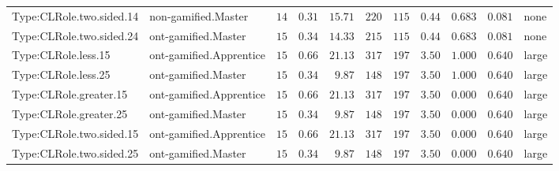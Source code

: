 \documentclass[6pt,a4paper]{article}
\begin{document}
{\begin{longtable}{llrrrrrrrrl}
Type:CLRole.two.sided.14&non-gamified.Master&$14$&$0.31$&$15.71$&$220$&$115$&$ 0.44$&$0.683$&$0.081$&none\tabularnewline
Type:CLRole.two.sided.24&ont-gamified.Master&$15$&$0.34$&$14.33$&$215$&$115$&$ 0.44$&$0.683$&$0.081$&none\tabularnewline
Type:CLRole.less.15&ont-gamified.Apprentice&$15$&$0.66$&$21.13$&$317$&$197$&$ 3.50$&$1.000$&$0.640$&large\tabularnewline
Type:CLRole.less.25&ont-gamified.Master&$15$&$0.34$&$ 9.87$&$148$&$197$&$ 3.50$&$1.000$&$0.640$&large\tabularnewline
Type:CLRole.greater.15&ont-gamified.Apprentice&$15$&$0.66$&$21.13$&$317$&$197$&$ 3.50$&$0.000$&$0.640$&large\tabularnewline
Type:CLRole.greater.25&ont-gamified.Master&$15$&$0.34$&$ 9.87$&$148$&$197$&$ 3.50$&$0.000$&$0.640$&large\tabularnewline
\newpage
Type:CLRole.two.sided.15&ont-gamified.Apprentice&$15$&$0.66$&$21.13$&$317$&$197$&$ 3.50$&$0.000$&$0.640$&large\tabularnewline
Type:CLRole.two.sided.25&ont-gamified.Master&$15$&$0.34$&$ 9.87$&$148$&$197$&$ 3.50$&$0.000$&$0.640$&large\tabularnewline
\hline
\end{longtable}}
\end{document}
